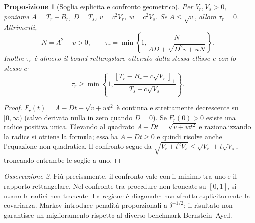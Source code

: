 \documentclass[11pt,a4paper]{article}
\newtheorem{proposition}{Proposizione}[section]
\theoremstyle{remark}\newtheorem{remark}[proposition]{Osservazione}
\begin{document}
\begin{proposition}[Soglia esplicita e confronto geometrico]\label{prop:root}
Per $V_r,V_s>0$, poniamo $A=T_r-B_r$, $D=T_s$, $v=c^2V_r$,
$w=c^2V_s$. Se $A\le\sqrt v$, allora $\tau_r=0$. Altrimenti,
\[
 N=A^2-v>0,\qquad
 \tau_r=\min\left\{1,\frac{N}{AD+\sqrt{D^2v+wN}}\right\}.
\]
Inoltre $\tau_r$ è almeno il bound rettangolare ottenuto dalla stessa
ellisse e con lo stesso $c$:
\[
 \tau_r\ge\min\left\{1,\frac{[T_r-B_r-c\sqrt{V_r}]_+}{T_s+c\sqrt{V_s}}\right\}.
\]
\end{proposition}
\begin{proof}
$F_r(t)=A-Dt-\sqrt{v+wt^2}$ è continua e strettamente decrescente
su $[0,\infty)$ (salvo derivata nulla in zero quando $D=0$).
Se $F_r(0)>0$ esiste una radice positiva unica. Elevando al quadrato
$A-Dt=\sqrt{v+wt^2}$ e razionalizzando la radice si ottiene la formula;
essa ha $A-Dt\ge0$ e quindi risolve anche l'equazione non quadratica.
Il confronto segue da $\sqrt{V_r+t^2V_s}\le\sqrt{V_r}+t\sqrt{V_s}$,
troncando entrambe le soglie a uno.
\end{proof}
\begin{remark}
Più precisamente, il confronto vale con il minimo tra uno e il rapporto
rettangolare. Nel confronto tra procedure non troncate su $[0,1]$,
si usano le radici non troncate. La regione è diagonale: non sfrutta
esplicitamente la covarianza. Markov introduce penalità proporzionali
a $\delta^{-1/2}$; il risultato non garantisce un miglioramento rispetto
al diverso benchmark Bernstein--Ayed.
\end{remark}
\end{document}
